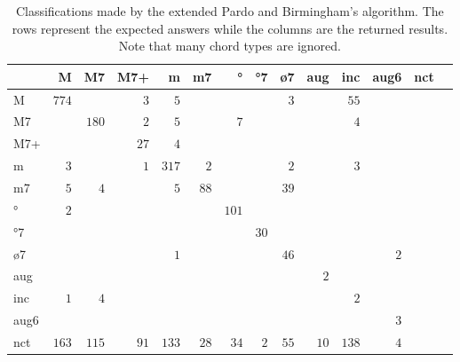 \documentclass{article}
\begin{document}
\begin{table*}
\centering
\begin{tabular}{l||r|r|r|r|r|r|r|r|r|r|r|r|r}
      &     M &    M7 &   M7+ &     m &    m7 &    ° &   °7 &   ø7 &   aug &   inc &  aug6 &   nct \\  \hline \hline
    M & $ 774 $ & $     $ & $   3 $ & $   5 $ & $     $ & $     $ & $     $ & $   3 $ & $     $ & $  55 $ & $     $ & $     $ \\ \hline
   M7 & $     $ & $ 180 $ & $   2 $ & $   5 $ & $     $ & $   7 $ & $     $ & $     $ & $     $ & $   4 $ & $     $ & $     $ \\ \hline
  M7+ & $     $ & $     $ & $  27 $ & $   4 $ & $     $ & $     $ & $     $ & $     $ & $     $ & $     $ & $     $ & $     $ \\ \hline
    m & $   3 $ & $     $ & $   1 $ & $ 317 $ & $   2 $ & $     $ & $     $ & $   2 $ & $     $ & $   3 $ & $     $ & $     $ \\ \hline
   m7 & $   5 $ & $   4 $ & $     $ & $   5 $ & $  88 $ & $     $ & $     $ & $  39 $ & $     $ & $     $ & $     $ & $     $ \\ \hline
   ° & $   2 $ & $     $ & $     $ & $     $ & $     $ & $ 101 $ & $     $ & $     $ & $     $ & $     $ & $     $ & $     $ \\ \hline
  °7 & $     $ & $     $ & $     $ & $     $ & $     $ & $     $ & $  30 $ & $     $ & $     $ & $     $ & $     $ & $     $ \\ \hline
  ø7 & $     $ & $     $ & $     $ & $   1 $ & $     $ & $     $ & $     $ & $  46 $ & $     $ & $     $ & $   2 $ & $     $ \\ \hline
  aug & $     $ & $     $ & $     $ & $     $ & $     $ & $     $ & $     $ & $     $ & $   2 $ & $     $ & $     $ & $     $ \\ \hline
  inc & $   1 $ & $   4 $ & $     $ & $     $ & $     $ & $     $ & $     $ & $     $ & $     $ & $   2 $ & $     $ & $     $ \\ \hline
 aug6 & $     $ & $     $ & $     $ & $     $ & $     $ & $     $ & $     $ & $     $ & $     $ & $     $ & $   3 $ & $     $ \\ \hline
  nct & $ 163 $ & $ 115 $ & $  91 $ & $ 133 $ & $  28 $ & $  34 $ & $   2 $ & $  55 $ & $  10 $ & $ 138 $ & $   4 $ & $     $ \\ \hline
\end{tabular}

\caption{Classifications made by the extended Pardo and Birmingham's algorithm. The rows represent
  the expected answers while the columns are the returned
  results. Note that many chord types are ignored.}
\label{tab:erros-es-pb}
\end{table*}
\end{document}
